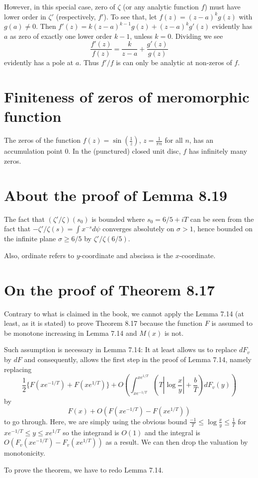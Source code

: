 \documentclass[12pt]{article}
\newcommand{\Abs}[1]{\left| #1 \right|}
\renewcommand{\O}[1]{O\left( #1 \right)}
\begin{document}
However, in this special case, zero of $\zeta$ (or any analytic function $f$) must have lower order in $\zeta'$ (respectively, $f'$). To see that, let $f(z) = (z - a)^k g(z)$ with $g(a) \not= 0$. Then $f'(z) = k (z - a)^{k-1} g(z) + (z - a)^k g'(z)$ evidently has $a$ as zero of exactly one lower order $k - 1$, unless $k = 0$. Dividing we see
$$\frac{f'(z)}{f(z)} = \frac{k}{z - a} + \frac{g'(z)}{g(z)}$$
evidently has a pole at $a$. Thus $f'/f$ is can only be analytic at non-zeros of $f$.

\section{Finiteness of zeros of meromorphic function}

The zeros of the function $f(z) = \sin(\frac{1}{z})$, $z = \frac{1}{\pi n}$ for all $n$, has an accumulation point $0$. In the (punctured) closed unit disc, $f$ has infinitely many zeros.

\section{About the proof of Lemma 8.19}

The fact that $(\zeta'/\zeta)(s_0)$ is bounded where $s_0 = 6/5 + iT$ can be seen from the fact that $-\zeta'/\zeta(s) = \int x^{-s} d\psi$ converges absolutely on $\sigma > 1$, hence bounded on the infinite plane $\sigma \geq 6/5$ by $\zeta'/\zeta(6/5)$.

Also, ordinate refers to $y$-coordinate and abscissa is the $x$-coordinate.

\section{On the proof of Theorem 8.17}

Contrary to what is claimed in the book, we cannot apply the Lemma 7.14 (at least, as it is stated) to prove Theorem 8.17 because the function $F$ is assumed to be monotone increasing in Lemma 7.14 and $M(x)$ is not.

Such assumption is necessary in Lemma 7.14: It at least allows us to replace $dF_v$ by $dF$ and consequently, allows the first step in the proof of Lemma 7.14, namely replacing
$$\frac12\{F(xe^{-1/T}) + F(xe^{1/T})\} + \O{\int_{xe^{-1/T}}^{xe^{1/T}} \left( T \Abs{\log \frac{x}{y}} + \frac{b}{T} \right) dF_v(y)}$$
by
$$F(x) + \O{F(xe^{-1/T}) - F(xe^{1/T})}$$
to go through. Here, we are simply using the obvious bound $\frac{-1}{T} \leq \log \frac{x}{y} \leq \frac{1}{T}$ for $xe^{-1/T} \leq y \leq xe^{1/T}$ so the integrand is $O(1)$ and the integral is $\O{F_v(xe^{-1/T}) - F_v(xe^{1/T})}$ as a result. We can then drop the valuation by monotonicity.

To prove the theorem, we have to redo Lemma 7.14.

\unless\ifdefined\IsMainDocument
\end{document}

